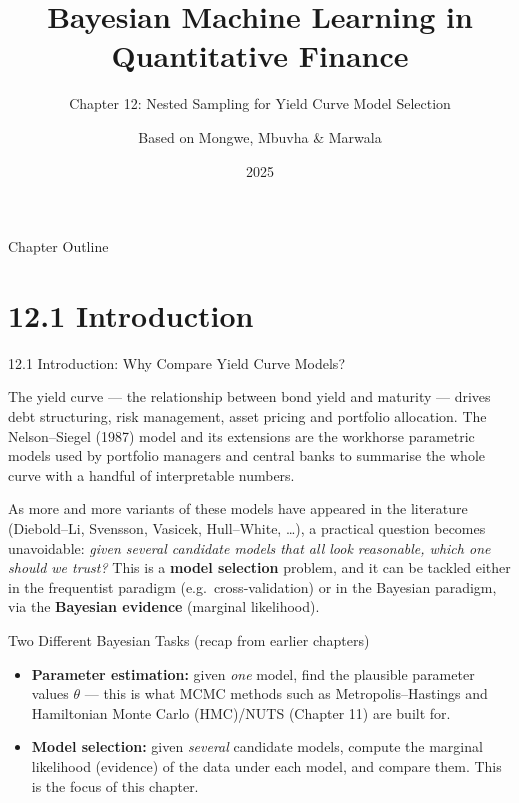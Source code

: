 \documentclass[aspectratio=169,10pt]{beamer}
\title[Bayesian ML in QF -- Ch.12]{Bayesian Machine Learning in Quantitative Finance}
\subtitle{Chapter 12: Nested Sampling for Yield Curve Model Selection}
\author{Based on Mongwe, Mbuvha \& Marwala}
\date{2025}
\begin{document}
\begin{frame}
  \titlepage
\end{frame}

\begin{frame}{Chapter Outline}
  \tableofcontents
\end{frame}

\section{12.1 Introduction}

\begin{frame}[allowframebreaks]{12.1 Introduction: Why Compare Yield Curve Models?}

The yield curve --- the relationship between bond yield and maturity --- drives debt structuring, risk management, asset pricing and portfolio allocation. The Nelson--Siegel (1987) model and its extensions are the workhorse parametric models used by portfolio managers and central banks to summarise the whole curve with a handful of interpretable numbers.

As more and more variants of these models have appeared in the literature (Diebold--Li, Svensson, Vasicek, Hull--White, \ldots), a practical question becomes unavoidable: \emph{given several candidate models that all look reasonable, which one should we trust?} This is a \textbf{model selection} problem, and it can be tackled either in the frequentist paradigm (e.g.\ cross-validation) or in the Bayesian paradigm, via the \textbf{Bayesian evidence} (marginal likelihood).

\begin{block}{Two Different Bayesian Tasks (recap from earlier chapters)}
\begin{itemize}
  \item \textbf{Parameter estimation:} given \emph{one} model, find the plausible parameter values $\theta$ --- this is what MCMC methods such as Metropolis--Hastings and Hamiltonian Monte Carlo (HMC)/NUTS (Chapter 11) are built for.
  \item \textbf{Model selection:} given \emph{several} candidate models, compute the marginal likelihood (evidence) of the data under each model, and compare them. This is the focus of this chapter.
\end{itemize}
\end{block}


\end{frame}
\end{document}
